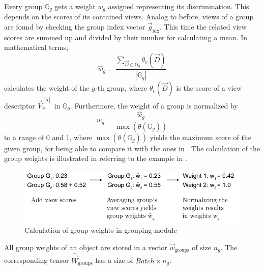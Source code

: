 Every group $\mathbb{G}_g$ gets a weight $w_g$ assigned representing its discrimination.
This depends on the scores of its contained views.
Analog to before, views of a group are found by checking the group index vector $\vec{g}_{\text{idx}}$.
This time the related view scores are summed up and divided by their number for calculating a mean.
In mathematical terms,
\begin{equation}
	\hat{w}_g = \frac{\sum_{\vec{D} \in \mathbb{G}_g} \theta_v(\vec{D})}{|\mathbb{G}_g|}
\end{equation}
calculates the weight of the $g$-th group, where $\theta_v(\vec{D})$ is the score of a view descriptor $\vec{V}_v^{[5]}$ in $\mathbb{G}_g$.
Furthermore, the weight of a group is normalized by
\begin{equation}
	w_g = \frac{\hat{w}_g}{\max(\theta(\mathbb{G}_g))}
\end{equation}
to a range of 0 and 1, where $\max(\theta(\mathbb{G}_g))$ yields the maximum score of the given group, for being able to compare it with the ones in \cite{Feng2018}.
The calculation of the group weights is illustrated in  referring to the example in .
\begin{figure}
	\centering
	\includegraphics[]{images/grouping_module_weights.pdf}
	\caption{Calculation of group weights in grouping module}
	\label{fig:grouping-module-weights}
\end{figure}
All group weights of an object are stored in a vector $\vec{w}_{\text{groups}}$ of size $n_g$.
The corresponding tensor $\bar{\vec{W}}_{\text{groups}}$ has a size of $Batch \times n_g$.